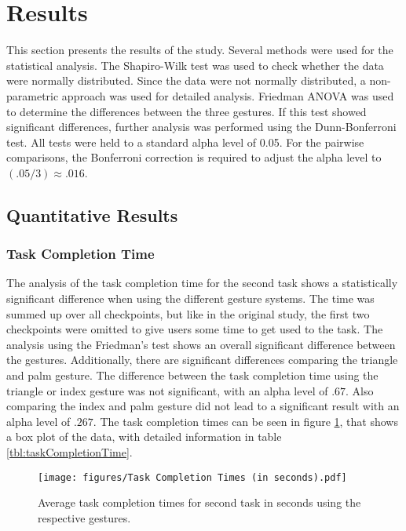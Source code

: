 \section{Results}
This section presents the results of the study. Several methods were used for the statistical analysis. The Shapiro-Wilk test was used to check whether the data were normally distributed. Since the data were not normally distributed, a non-parametric approach was used for detailed analysis. Friedman ANOVA was used to determine the differences between the three gestures. If this test showed significant differences, further analysis was performed using the Dunn-Bonferroni test. All tests were held to a standard alpha level of 0.05. For the
pairwise comparisons, the Bonferroni correction is required to adjust the alpha level to $(.05/3) \approx .016$.

\subsection{Quantitative Results}

\subsubsection{Task Completion Time}
The analysis of the task completion time for the second task shows a statistically significant difference when using the different gesture systems. The time was summed up over all checkpoints, but like in the original study, the first two checkpoints were omitted to give users some time to get used to the task. The analysis using the Friedman's test shows an overall significant difference between the gestures. Additionally, there are significant differences comparing the triangle and palm gesture. The difference between the task completion time using the triangle or index gesture was not significant, with an alpha level of $.67$. Also comparing the index and palm gesture did not lead to a significant result with an alpha level of $.267$.
The task completion times can be seen in figure \ref{fig:taskCompletionTime}, that shows a box plot of the data, with detailed information in table \ref{tbl:taskCompletionTime}. 

\begin{figure}[!h]
    \centering
    \texttt{[image: figures/Task Completion Times (in seconds).pdf]}
    \caption{Average task completion times for second task in seconds using the respective gestures.}
    \label{fig:taskCompletionTime}
\end{figure}

